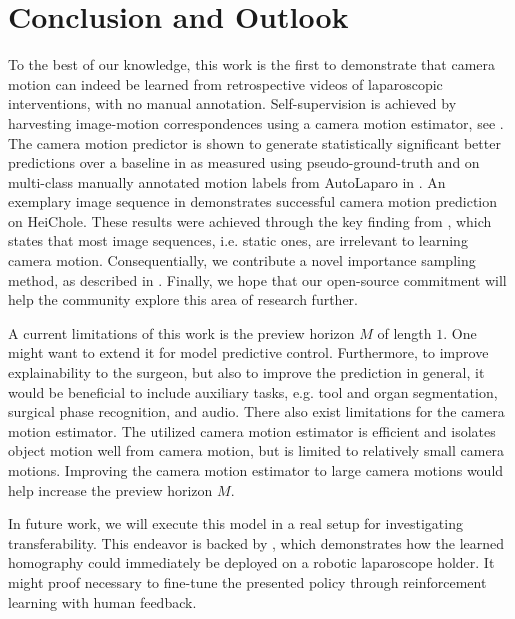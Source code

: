 \section{Conclusion and Outlook}
To the best of our knowledge, this work is the first
to demonstrate that camera motion can indeed be learned from 
retrospective
videos of laparoscopic interventions,
with no manual annotation.
Self-supervision is achieved 
by harvesting image-motion correspondences using a camera motion estimator, see . The camera motion predictor is shown to generate statistically significant better predictions over a baseline in  as measured using pseudo-ground-truth and on multi-class manually annotated motion labels from AutoLaparo in . An exemplary image sequence in  demonstrates successful camera motion prediction on HeiChole. These results were achieved through the key finding from , which states that most image sequences, i.e. static ones, are irrelevant to learning camera motion. Consequentially, we contribute a novel importance sampling method, as described in . Finally, we hope that our open-source commitment will help the community explore this area of research further.

A current limitations of this work is the preview horizon $M$ of length $1$. One might want to extend it for model predictive control. Furthermore, to improve explainability to the surgeon, but also to improve the prediction in general, it would be beneficial to include auxiliary tasks, e.g. tool and organ segmentation, surgical phase recognition, and audio. There also exist limitations for the camera motion estimator. The utilized camera motion estimator is efficient and isolates object motion well from camera motion, but is limited to relatively small camera motions. Improving the camera motion estimator to large camera motions would help increase the preview horizon $M$.

In future work, we will execute this model in a real setup for investigating transferability. This endeavor is backed by \cite{huber2021homography}, which demonstrates how the learned homography could immediately be deployed on a robotic laparoscope holder. It  might proof necessary to fine-tune the presented policy through reinforcement learning with human feedback.

